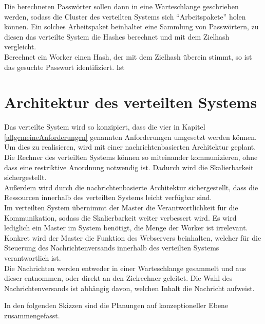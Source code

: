 Die berechneten Passwörter sollen dann in eine Warteschlange geschrieben werden, sodass die Cluster des verteilten Systems sich \enquote{Arbeitspakete} holen können. Ein solches Arbeitspaket beinhaltet eine Sammlung von Passwörtern, zu diesen das verteilte System die Hashes berechnet und mit dem Zielhash vergleicht.\\
 Berechnet ein Worker einen Hash, der mit dem Zielhash überein stimmt, so ist das gesuchte Passwort identifiziert. Ist 


\section{Architektur des verteilten Systems}
Das verteilte System wird so konzipiert, dass die vier in Kapitel \ref{allgemeineAnforderungen} genannten Anforderungen umgesetzt werden können. Um dies zu realisieren, wird mit einer nachrichtenbasierten Architektur geplant. Die Rechner des verteilten Systems können so miteinander kommunizieren, ohne dass eine restriktive Anordnung notwendig ist. Dadurch wird die Skalierbarkeit sichergestellt. \\
Außerdem wird durch die nachrichtenbasierte Architektur sichergestellt, dass die Ressourcen innerhalb des verteilten Systems leicht verfügbar sind. \\
Im verteilten System übernimmt der Master die Verantwortlichkeit für die Kommunikation, sodass die Skalierbarkeit weiter verbessert wird. Es wird lediglich ein Master im System benötigt, die Menge der Worker ist irrelevant. Konkret wird der Master die Funktion des Webservers beinhalten, welcher für die Steuerung des Nachrichtenversands innerhalb des verteilten Systems verantwortlich ist. \\
Die Nachrichten werden entweder in einer Warteschlange gesammelt und aus dieser entnommen, oder direkt an den Zielrechner geleitet. Die Wahl des Nachrichtenversands ist abhängig davon, welchen Inhalt die Nachricht aufweist.

In den folgenden Skizzen sind die Planungen auf konzeptioneller Ebene zusammengefasst.


